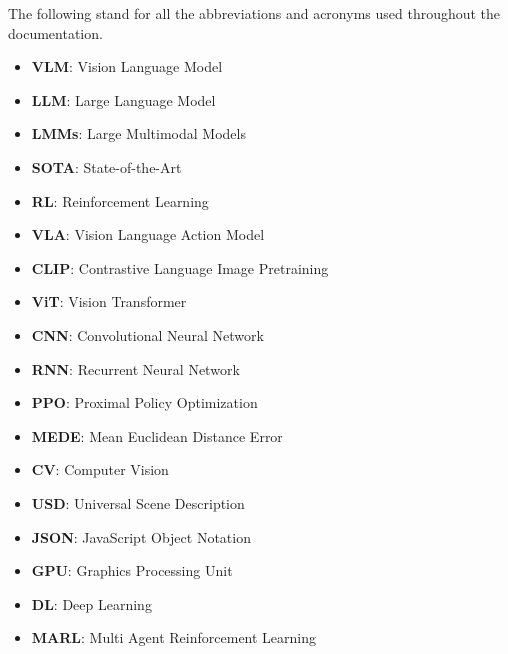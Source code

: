 The following stand for all the abbreviations and acronyms used throughout the documentation.

\begin{itemize}
	\item \textbf{VLM}: Vision Language Model
	\item \textbf{LLM}: Large Language Model
	\item \textbf{LMMs}: Large Multimodal Models
	\item \textbf{SOTA}: State-of-the-Art
	\item \textbf{RL}: Reinforcement Learning
	\item \textbf{VLA}: Vision Language Action Model
	\item \textbf{CLIP}: Contrastive Language Image Pretraining
	\item \textbf{ViT}: Vision Transformer
	\item \textbf{CNN}: Convolutional Neural Network
	\item \textbf{RNN}: Recurrent Neural Network
	\item \textbf{PPO}: Proximal Policy Optimization
	\item \textbf{MEDE}: Mean Euclidean Distance Error
	\item \textbf{CV}: Computer Vision
	\item \textbf{USD}: Universal Scene Description
	\item \textbf{JSON}: JavaScript Object Notation
	\item \textbf{GPU}: Graphics Processing Unit
	\item \textbf{DL}: Deep Learning
	\item \textbf{MARL}: Multi Agent Reinforcement Learning

\end{itemize}